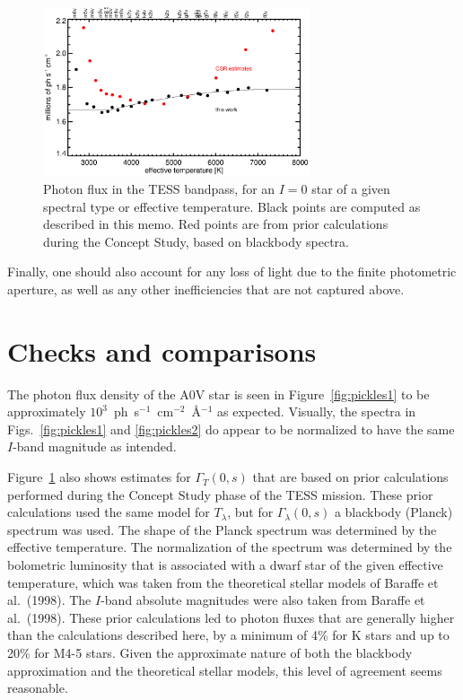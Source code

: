 \documentclass[preprint,10pt]{aastex}
\begin{document}
\begin{figure}
\begin{center}
\includegraphics[width=0.7\textwidth]{ph_versus_teff.eps}
\end{center}
\caption{Photon flux in the TESS bandpass, for an $I=0$ star of
a given spectral type or effective temperature.
Black points are computed as described in this memo.
Red points are from prior calculations during the Concept Study,
based on blackbody spectra.}
\label{fig:ph_versus_teff}
\end{figure}

Finally, one should also
account for any loss of light due to the finite photometric aperture,
as well as any other inefficiencies that are not captured above. 

\section{Checks and comparisons}

The photon flux density of the A0V star is seen in
Figure~\ref{fig:pickles1} to be approximately
$10^3$~ph~s$^{-1}$~cm$^{-2}$~\AA$^{-1}$ as expected.  Visually, the
spectra in Figs.~\ref{fig:pickles1} and \ref{fig:pickles2} do appear
to be normalized to have the same $I$-band magnitude as intended.

Figure~\ref{fig:ph_versus_teff} also shows estimates for $\Gamma_T(0,s)$ that are based on prior calculations performed during the Concept Study phase of the TESS mission. These prior calculations used the same model for $T_\lambda$, but
for $\Gamma_\lambda(0,s)$ a blackbody (Planck) spectrum was used.  The shape of the Planck spectrum was determined by the effective temperature.  The normalization of the spectrum was determined by the bolometric luminosity that is associated with a dwarf star of the given effective temperature, which was taken from the theoretical stellar models of Baraffe et al.~(1998).  The $I$-band absolute magnitudes were also taken from Baraffe et al.~(1998).  These prior calculations led to photon fluxes that are generally higher than the calculations described here, by a minimum of 4\% for K stars and up to 20\% for M4-5 stars.  Given the approximate nature of both the blackbody approximation and the theoretical stellar models, this level of agreement seems reasonable.
\end{document}
